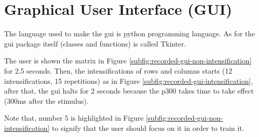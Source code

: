 \section{Graphical User Interface (GUI)}
The language used to make the \ac{gui} is python programming language. As for the \ac{gui} package itself (classes and functions) is called Tkinter.\par
The user is shown the matrix in Figure \ref{subfig:recorded-gui-non-intensification} for 2.5 seconds. Then, the intensifications of rows and columns starts (12 intensifications, 15 repetitions) as in Figure \ref{subfig:recorded-gui-intensification}, after that, the \ac{gui} halts for 2 seconds because the \ac{p300} takes time to take effect (300ms after the stimulus).\par
Note that, number 5 is highlighted in Figure \ref{subfig:recorded-gui-non-intensification} to signify that the user should focus on it in order to train it.\par
